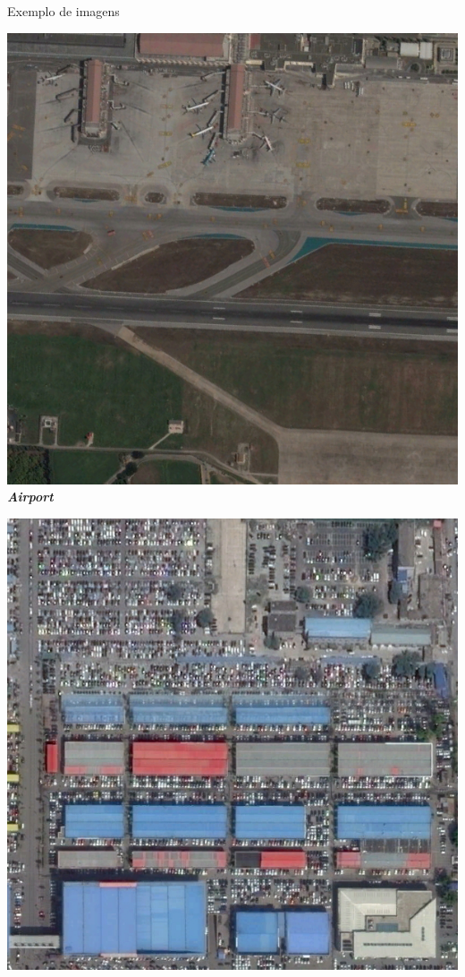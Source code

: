     \begin{frame}{Exemplo de imagens}
        \centering
        \begin{minipage}[b]{0.3\linewidth}
            \centering
            \includegraphics[width=\textwidth]{AID/airport_126.jpg}
            \scriptsize \textbf{\textit{Airport}}
        \end{minipage}
        \hspace{0.03\linewidth}
        \begin{minipage}[b]{0.3\linewidth}
            \centering
            \includegraphics[width=\textwidth]{AID/industrial_12.jpg}

\end{minipage}
\end{frame}
